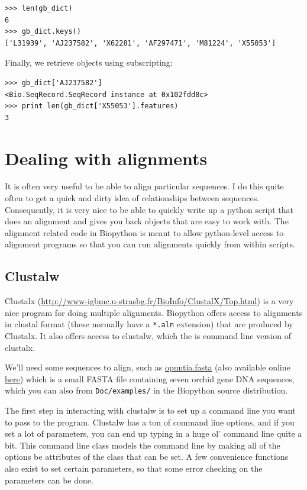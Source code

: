 \documentclass{report}
\begin{document}
\begin{verbatim}
>>> len(gb_dict)
6
>>> gb_dict.keys()
['L31939', 'AJ237582', 'X62281', 'AF297471', 'M81224', 'X55053']
\end{verbatim}

Finally, we retrieve objects using subscripting:

\begin{verbatim}
>>> gb_dict['AJ237582']
<Bio.SeqRecord.SeqRecord instance at 0x102fdd8c>
>>> print len(gb_dict['X55053'].features)
3
\end{verbatim}

\section{Dealing with alignments}

It is often very useful to be able to align particular sequences. I do this quite often to get a quick and dirty idea of relationships between sequences. Consequently, it is very nice to be able to quickly write up a python script that does an alignment and gives you back objects that are easy to work with. The alignment related code in Biopython is meant to allow python-level access to alignment programs so that you can run alignments quickly from within scripts.

\subsection{Clustalw}
\label{sec:align_clustal}

Clustalx (\url{http://www-igbmc.u-strasbg.fr/BioInfo/ClustalX/Top.html}) is a very nice program for doing multiple alignments. Biopython offers access to alignments in clustal format (these normally have a \verb|*.aln| extension) that are produced by Clustalx. It also offers access to clustalw, which the is command line version of clustalx.

We'll need some sequences to align, such as \href{examples/opuntia.fasta}{opuntia.fasta} (also available online \href{http://biopython.org/DIST/docs/tutorial/examples/opuntia.fasta}{here}) which is a small FASTA file containing seven orchid gene DNA sequences, which you can also from \verb|Doc/examples/| in the Biopython source distribution.

The first step in interacting with clustalw is to set up a command line you want to pass to the program. Clustalw has a ton of command line options, and if you set a lot of parameters, you can end up typing in a huge ol' command line quite a bit. This command line class models the command line by making all of the options be attributes of the class that can be set. A few convenience functions also exist to set certain parameters, so that some error checking on the parameters can be done.
\end{document}
